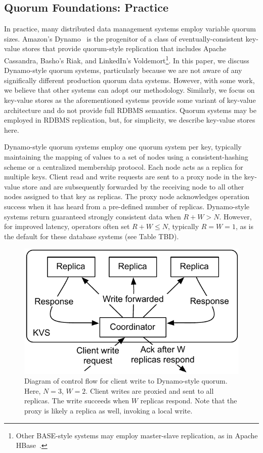 \documentclass{vldb}
\begin{document}
\subsection{Quorum Foundations: Practice}
\label{sec:practice}

In practice, many distributed data management systems employ variable
quorum sizes. Amazon's Dynamo~\cite{dynamo} is the progenitor of a
class of eventually-consistent key-value stores that provide
quorum-style replication that includes Apache Cassandra, Basho's Riak,
and LinkedIn's Voldemort\footnote{Other BASE-style systems may employ
  master-slave replication, as in Apache HBase~\cite{hbase}.}.  In
this paper, we discuss Dynamo-style quorum systems, particularly
because we are not aware of any significally different production
quorum data systems.  However, with some work, we believe that other
systems can adopt our methodology.  Similarly, we focus on key-value
stores as the aforementioned systems provide some variant of key-value
architecture and do not provide full RDBMS semantics.  Quorum systems
may be employed in RDBMS replication, but, for simplicity, we describe
key-value stores here.

Dynamo-style quorum systems employ one quorum system per key,
typically maintaining the mapping of values to a set of nodes using a
consistent-hashing scheme or a centralized membership protocol. Each
node acts as a replica for multiple keys.  Client read and write
requests are sent to a proxy node in the key-value store and are
subsequently forwarded by the receiving node to all other nodes
assigned to that key as replicas.  The proxy node acknowledges
operation success when it has heard from a pre-defined number of
replicas.  Dynamo-style systems return guaranteed strongly consistent
data when $R+W > N$.  However, for improved latency, operators often
set $R+W \leq N$, typically $R=W=1$, as is the default for these
database systems (see Table TBD).

\begin{figure}
\centering
\includegraphics[width=.8\columnwidth]{figs/dynamo-quorum.pdf}
\caption{Diagram of control flow for client write to Dynamo-style
  quorum.  Here, $N=3$, $W=2$. Client writes are proxied and sent to
  all replicas. The write succeeds when $W$ replicas respond.  Note
  that the proxy is likely a replica as well, invoking a local write.}
\label{fig:dynamo-quorum}
\end{figure}
\end{document}
